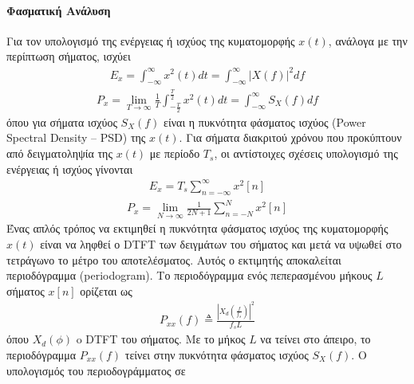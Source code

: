 \documentclass[letterpaper,10pt,english]{sphinxmanual}
\begin{document}
\paragraph{Φασματική Ανάλυση}
\label{\detokenize{Exercise1_2:id2}}
\sphinxAtStartPar
Για τον υπολογισμό της ενέργειας ή ισχύος της κυματομορφής \(x(t)\), ανάλογα με την περίπτωση
σήματος, ισχύει
\begin{equation*}
\begin{split}E_x= \int_{-\infty}^{\infty} x^2(t) dt = \int_{-\infty}^{\infty} |X(f)|^2 df\end{split}
\end{equation*}\begin{equation*}
\begin{split}P_x= \lim_{T\to\infty} \frac{1}{T} \int_{-\frac{T}{2}}^{\frac{T}{2}} x^2(t) dt = \int_{-\infty}^{\infty} S_X(f) df\end{split}
\end{equation*}
\sphinxAtStartPar
όπου για σήματα ισχύος \(S_Χ(f)\) είναι η πυκνότητα φάσματος ισχύος (Power Spectral Density – PSD)
της \(x(t)\). Για σήματα διακριτού χρόνου που προκύπτουν από δειγματοληψία της \(x(t)\) με περίοδο \(T_s\),
οι αντίστοιχες σχέσεις υπολογισμό της ενέργειας ή ισχύος γίνονται
\begin{equation*}
\begin{split}E_x= T_s\sum_{n=-\infty}^{\infty} x^2[n]\end{split}
\end{equation*}\begin{equation*}
\begin{split}P_x= \lim_{N\to\infty} \frac{1}{2N+1} \sum_{n=-N}^{N} x^2[n]\end{split}
\end{equation*}
\sphinxAtStartPar
Ένας απλός τρόπος να εκτιμηθεί η πυκνότητα φάσματος ισχύος της κυματομορφής \(x(t)\) είναι να
ληφθεί ο DTFT των δειγμάτων του σήματος και μετά να υψωθεί στο τετράγωνο το μέτρο του
αποτελέσματος. Αυτός ο εκτιμητής αποκαλείται περιοδόγραμμα (periodogram). Το περιοδόγραμμα
ενός πεπερασμένου μήκους \(L\) σήματος \(x[n]\) ορίζεται ως
\begin{equation*}
\begin{split}P_{xx}(f)\triangleq \frac{|X_d(\frac{f}{f_s})| ^2}{f_sL}\end{split}
\end{equation*}
\sphinxAtStartPar
όπου \(X_d(\phi)\) o DTFT του σήματος. Με το μήκος \(L\) να τείνει στο άπειρο, το περιοδόγραμμα \(P_{xx}(f)\)
τείνει στην πυκνότητα φάσματος ισχύος \(S_Χ(f)\). Ο υπολογισμός του περιοδογράμματος σε
\end{document}
